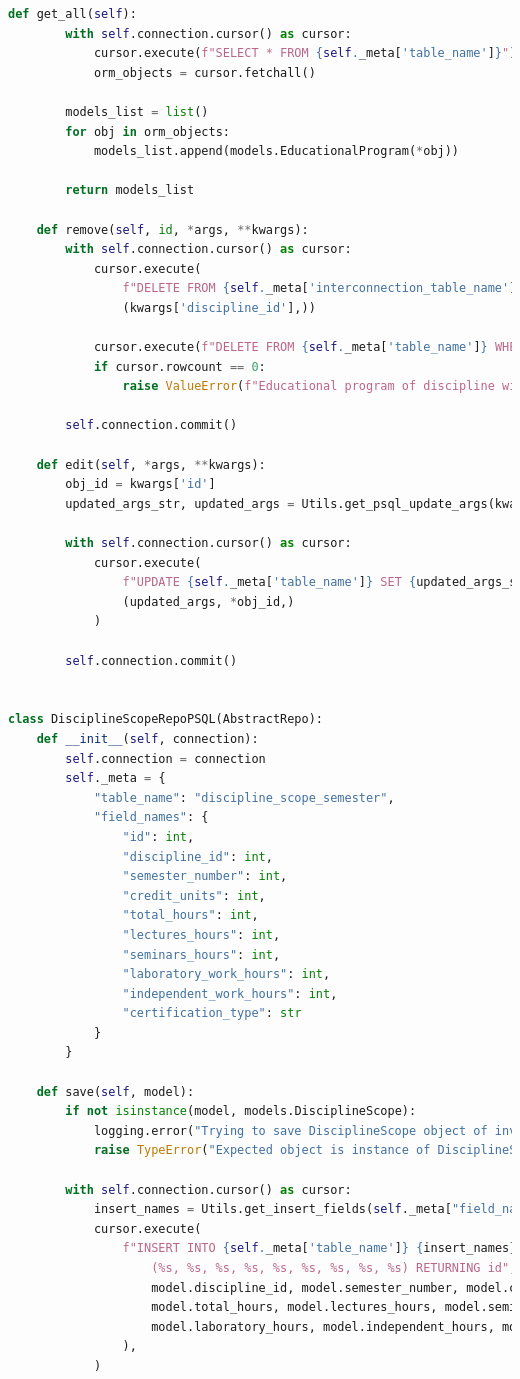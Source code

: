 \begin{lstlisting}[label=lst:db-postgresql, caption=Листинг модуля взаимодействия c СУБД PostgreSQL, language=python]
	def get_all(self):
		with self.connection.cursor() as cursor:
			cursor.execute(f"SELECT * FROM {self._meta['table_name']}")
			orm_objects = cursor.fetchall()
		
		models_list = list()
		for obj in orm_objects:
			models_list.append(models.EducationalProgram(*obj))
		
		return models_list
	
	def remove(self, id, *args, **kwargs):
		with self.connection.cursor() as cursor:
			cursor.execute(
				f"DELETE FROM {self._meta['interconnection_table_name']} WHERE discipline_id = %s",
				(kwargs['discipline_id'],))
		
			cursor.execute(f"DELETE FROM {self._meta['table_name']} WHERE id = %s", (id,))
			if cursor.rowcount == 0:
				raise ValueError(f"Educational program of discipline with id = {id} doesn't exists.")
		
		self.connection.commit()
	
	def edit(self, *args, **kwargs):
		obj_id = kwargs['id']
		updated_args_str, updated_args = Utils.get_psql_update_args(kwargs['fields'])
		
		with self.connection.cursor() as cursor:
			cursor.execute(
				f"UPDATE {self._meta['table_name']} SET {updated_args_str} WHERE id = %s",
				(updated_args, *obj_id,)
			)
		
		self.connection.commit()


class DisciplineScopeRepoPSQL(AbstractRepo):
	def __init__(self, connection):
		self.connection = connection
		self._meta = {
			"table_name": "discipline_scope_semester",
			"field_names": {
				"id": int,
				"discipline_id": int,
				"semester_number": int,
				"credit_units": int,
				"total_hours": int,
				"lectures_hours": int,
				"seminars_hours": int,
				"laboratory_work_hours": int,
				"independent_work_hours": int,
				"certification_type": str
			}
		}
	
	def save(self, model):
		if not isinstance(model, models.DisciplineScope):
			logging.error("Trying to save DisciplineScope object of invalid type")
			raise TypeError("Expected object is instance of DisciplineScope")
		
		with self.connection.cursor() as cursor:
			insert_names = Utils.get_insert_fields(self._meta["field_names"])
			cursor.execute(
				f"INSERT INTO {self._meta['table_name']} {insert_names} VALUES \
					(%s, %s, %s, %s, %s, %s, %s, %s, %s) RETURNING id", (
					model.discipline_id, model.semester_number, model.credit_units,
					model.total_hours, model.lectures_hours, model.seminars_hours,
					model.laboratory_hours, model.independent_hours, model.certification_type
				),
			)
		

\end{lstlisting}
